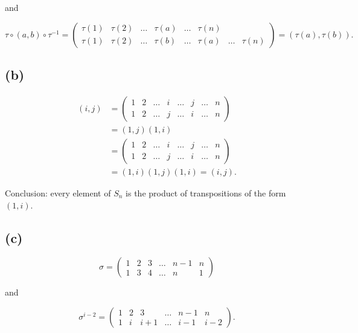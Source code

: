 and

\[\tau \circ \left( {a,b} \right) \circ \tau^{- 1} = \begin{pmatrix}
{\tau(1)} & {\tau(2)} & \ldots & {\tau(a)} & \ldots & {\tau(n)} & & \\
{\tau(1)} & {\tau(2)} & \ldots & {\tau(b)} & \ldots & {\tau(a)} & \ldots & {\tau(n)}
\end{pmatrix} = \left( {\tau(a),\tau(b)} \right).\]

\subsection{(b)}

\[\begin{matrix}
\left( {i,j} \right) & {= \begin{pmatrix}
1 & 2 & \ldots & i & \ldots & j & \ldots & n \\
1 & 2 & \ldots & j & \ldots & i & \ldots & n
\end{pmatrix}} \\
 & {= \left( {1,j} \right)\left( {1,i} \right)} \\
 & {= \begin{pmatrix}
1 & 2 & \ldots & i & \ldots & j & \ldots & n \\
1 & 2 & \ldots & j & \ldots & i & \ldots & n
\end{pmatrix}} \\
 & {= \left( {1,i} \right)\left( {1,j} \right)\left( {1,i} \right) = \left( {i,j} \right).}
\end{matrix}\]

Conclusion: every element of \(S_{n}\) is the product of transpositions of the form \(\left( {1,i} \right)\).

\subsection{(c)}

\[\sigma = \begin{pmatrix}
1 & 2 & 3 & \ldots & {n - 1} & n \\
1 & 3 & 4 & \ldots & n & 1
\end{pmatrix}\]

and

\[\sigma^{i - 2} = \begin{pmatrix}
1 & 2 & 3 & \ldots & {n - 1} & n \\
1 & i & {i + 1} & \ldots & {i - 1} & {i - 2}
\end{pmatrix}.\]


